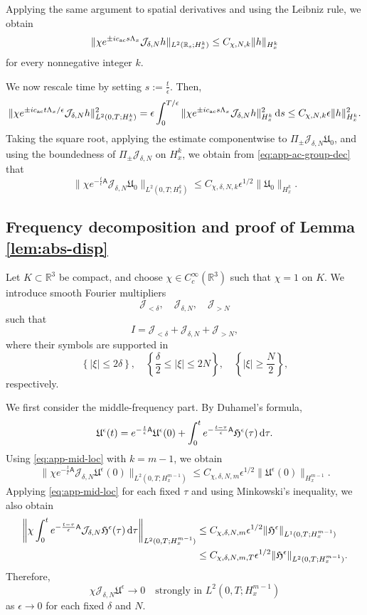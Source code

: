 \documentclass[10pt,reqno]{amsart}
\numberwithin{equation}{section}
\newcommand{\lt}{\left}
\newcommand{\rt}{\right}
\newcommand{\R}{\mathbb R}
\newcommand{\bq}{\begin{equation}}
\newcommand{\eq}{\end{equation}}
\newcommand{\calJ}{\mathcal J}
\newcommand{\ds}{\textnormal{d}s}
\begin{document}
Applying the same argument to spatial derivatives and using the Leibniz rule, we obtain
\[
\| \chi e^{\pm ic_{\rm ac}s\Lambda_x} \calJ_{\delta,N} h \|_{L^2(\R_s;H^k_x)} \le C_{\chi,N,k} \| h \|_{H^k_x}
\]
for every nonnegative integer $k$.

We now rescale time by setting $s := \frac{t}{\epsilon}$. Then,
\[
\| \chi e^{\pm ic_{\rm ac}t\Lambda_x/\epsilon} \calJ_{\delta,N} h \|_{L^2(0,T;H^k_x)}^2 = \epsilon \int_0^{T/\epsilon} \| \chi e^{\pm ic_{\rm ac}s\Lambda_x} \calJ_{\delta,N} h \|_{H^k_x}^2 \,\ds \le C_{\chi,N,k} \epsilon \| h \|_{H^k_x}^2.
\]
Taking the square root, applying the estimate componentwise to $\Pi_\pm\calJ_{\delta,N}\mathfrak U_0$, and using the boundedness of $\Pi_\pm\calJ_{\delta,N}$ on $H^k_x$, we obtain from \eqref{eq:app-ac-group-dec} that
\bq\label{eq:app-mid-loc}
\| \chi e^{-\frac{t}{\epsilon}\mathsf A} \calJ_{\delta,N} \mathfrak U_0 \|_{L^2(0,T;H^k_x)} \le C_{\chi,\delta,N,k} \epsilon^{1/2} \| \mathfrak U_0 \|_{H^k_x}.
\eq

%
%
%
%
%
%
%
%
%
%
\subsection{Frequency decomposition and proof of Lemma \ref{lem:abs-disp}}


Let $K \subset \R^3$ be compact, and choose $\chi \in C_c^\infty(\R^3)$ such that $\chi = 1$ on $K$. We introduce smooth Fourier multipliers
\[
\calJ_{<\delta}, \quad \calJ_{\delta,N}, \quad \calJ_{>N}
\]
such that
\[
I = \calJ_{<\delta} + \calJ_{\delta,N} + \calJ_{>N},
\]
where their symbols are supported in
\[
\lt\{ |\xi| \le 2\delta \rt\}, \quad \lt\{ \frac{\delta}{2} \le |\xi| \le 2N \rt\}, \quad \lt\{ |\xi| \ge \frac{N}{2} \rt\},
\]
respectively.

We first consider the middle-frequency part. By Duhamel's formula,
\[
\mathfrak U^\epsilon(t) = e^{-\frac{t}{\epsilon}\mathsf A} \mathfrak U^\epsilon(0) + \int_0^t e^{-\frac{t-\tau}{\epsilon}\mathsf A} \mathfrak H^\epsilon(\tau) \,\textnormal{d}\tau.
\]
Using \eqref{eq:app-mid-loc} with $k=m-1$, we obtain
\[
\| \chi e^{-\frac{t}{\epsilon}\mathsf A} \calJ_{\delta,N} \mathfrak U^\epsilon(0) \|_{L^2(0,T;H^{m-1}_x)} \le C_{\chi,\delta,N,m} \epsilon^{1/2} \| \mathfrak U^\epsilon(0) \|_{H^{m-1}_x}.
\]
Applying \eqref{eq:app-mid-loc} for each fixed $\tau$ and using Minkowski's inequality, we also obtain
\begin{align*}
\lt\| \chi \int_0^t e^{-\frac{t-\tau}{\epsilon}\mathsf A} \calJ_{\delta,N} \mathfrak H^\epsilon(\tau) \,\textnormal{d}\tau \rt\|_{L^2(0,T;H^{m-1}_x)}  &\le C_{\chi,\delta,N,m} \epsilon^{1/2} \| \mathfrak H^\epsilon \|_{L^1(0,T;H^{m-1}_x)} \\
& \le C_{\chi,\delta,N,m,T} \epsilon^{1/2} \| \mathfrak H^\epsilon \|_{L^2(0,T;H^{m-1}_x)}.
\end{align*}
Therefore,
\bq\label{eq:app-mid-zero}
\chi \calJ_{\delta,N} \mathfrak U^\epsilon \to 0 \quad \text{strongly in } L^2 \lt( 0,T; H^{m-1}_x \rt)
\eq
as $\epsilon\to0$ for each fixed $\delta$ and $N$.
\end{document}
